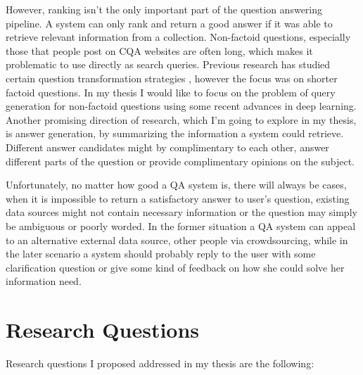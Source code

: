 However, ranking isn't the only important part of the question answering pipeline.
A system can only rank and return a good answer if it was able to retrieve relevant information from a collection.
Non-factoid questions, especially those that people post on CQA websites are often long, which makes it problematic to use directly as search queries.
Previous research has studied certain question transformation strategies \cite{AgichteinLG01,brill_askmsr,lin2003question}, however the focus was on shorter factoid questions.
In my thesis I would like to focus on the problem of query generation for non-factoid questions using some recent advances in deep learning.
Another promising direction of research, which I'm going to explore in my thesis, is answer generation, \ie by summarizing the information a system could retrieve.
Different answer candidates might by complimentary to each other, answer different parts of the question or provide complimentary opinions on the subject.

Unfortunately, no matter how good a QA system is, there will always be cases, when it is impossible to return a satisfactory answer to user's question, \eg existing data sources might not contain necessary information or the question may simply be ambiguous or poorly worded.
In the former situation a QA system can appeal to an alternative external data source, \eg other people via crowdsourcing, while in the later scenario a system should probably reply to the user with some clarification question or give some kind of feedback on how she could solve her information need.


\section{Research Questions}

Research questions I proposed addressed in my thesis are the following:

